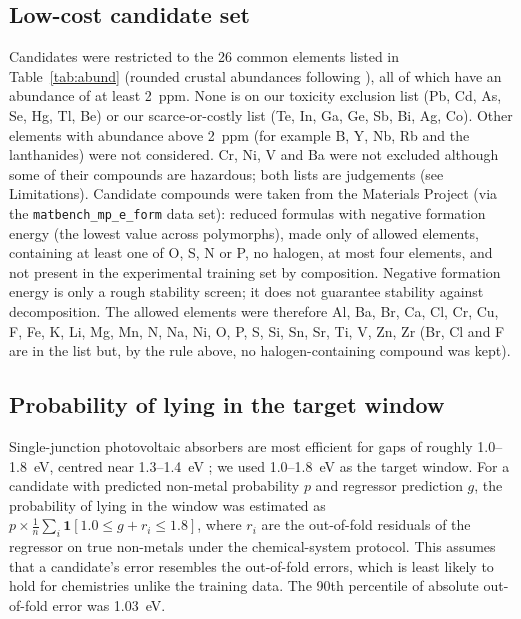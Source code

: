 \documentclass[11pt,a4paper]{article}
\begin{document}
\subsection{Low-cost candidate set}
Candidates were restricted to the 26 common elements listed in Table~\ref{tab:abund} (rounded crustal abundances following \cite{CRC}), all of which have an abundance of at least 2~ppm. None is on our toxicity exclusion list (Pb, Cd, As, Se, Hg, Tl, Be) or our scarce-or-costly list (Te, In, Ga, Ge, Sb, Bi, Ag, Co). Other elements with abundance above 2~ppm (for example B, Y, Nb, Rb and the lanthanides) were not considered. Cr, Ni, V and Ba were not excluded although some of their compounds are hazardous; both lists are judgements (see Limitations).
Candidate compounds were taken from the Materials Project \cite{Jain2013} (via the \texttt{matbench\_mp\_e\_form} data set): reduced formulas with negative formation energy (the lowest value across polymorphs),
made only of allowed elements, containing at least one of O, S, N or P, no halogen, at most four elements, and not present in the experimental training set by composition.
Negative formation energy is only a rough stability screen; it does not guarantee stability against decomposition. The allowed elements were therefore Al, Ba, Br, Ca, Cl, Cr, Cu, F, Fe, K, Li, Mg, Mn, N, Na, Ni, O, P, S, Si, Sn, Sr, Ti, V, Zn, Zr (Br, Cl and F are in the list but, by the rule above, no halogen-containing compound was kept).

\subsection{Probability of lying in the target window}
Single-junction photovoltaic absorbers are most efficient for gaps of roughly 1.0--1.8~eV, centred near 1.3--1.4~eV \cite{SQ1961}; we used 1.0--1.8~eV as the target window.
For a candidate with predicted non-metal probability $p$ and regressor prediction $g$, the probability of lying in the window was estimated as
$p \times \frac{1}{n}\sum_i \mathbf{1}[1.0 \le g + r_i \le 1.8]$, where $r_i$ are the out-of-fold residuals of the regressor on true non-metals under the chemical-system protocol.
This assumes that a candidate's error resembles the out-of-fold errors, which is least likely to hold for chemistries unlike the training data.
The 90th percentile of absolute out-of-fold error was 1.03~eV.
\end{document}
